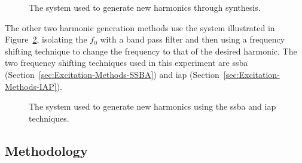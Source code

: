 		\begin{figure}[h!]
			\centering
			\caption{The system used to generate new harmonics through synthesis.}
			\label{fig:Synthesise}
		\end{figure}

		The other two harmonic generation methods use the system illustrated in Figure~\ref{fig:FilterAndShift},
		isolating the $f_{0}$ with a band pass filter and then using a frequency shifting technique to change the
		frequency to that of the desired harmonic. The two frequency shifting techniques used in this experiment
		are \acrshort{ssba} (Section~\ref{sec:Excitation-Methods-SSBA}) and \acrshort{iap}
		(Section~\ref{sec:Excitation-Methods-IAP}).

		\begin{figure}[h!]
			\centering
			\caption{The system used to generate new harmonics using the \acrshort{ssba} and \acrshort{iap}
				 techniques.}
			\label{fig:FilterAndShift}
		\end{figure}

	\subsection{Methodology}
	\label{sec:PerceptualExperiments-Reconstruction-Methodology}
